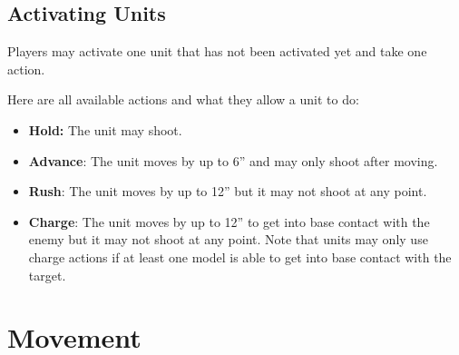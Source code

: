 \documentclass[9pt, a4paper]{extarticle}            %
\begin{document}
\begin{multicols}{2}
\subsection{Activating Units}

Players may activate one unit that has not been activated yet and take one action.

Here are all available actions and what they allow a unit to do:

\begin{itemize}
  \item \textbf{Hold:} The unit may shoot.
  \item \textbf{Advance}: The unit moves by up to 6” and may only shoot after moving.
  \item \textbf{Rush}: The unit moves by up to 12” but it may not shoot at any point.
  \item \textbf{Charge}: The unit moves by up to 12” to get into base contact with the enemy but it may not shoot at any point. Note that units may only use charge actions if at least one model is able to get into base contact with the target.
\end{itemize}

\vfill

\columnbreak

\vfill\null

\end{multicols}


\newpage



\section{Movement}
\end{document}
